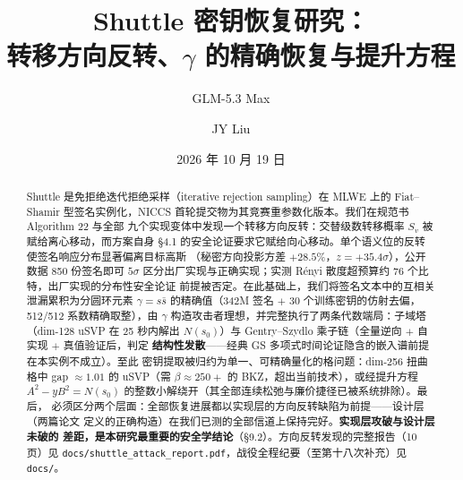 \documentclass[UTF8,11pt,a4paper]{ctexart}
\title{\vspace{-1.2cm}\textbf{Shuttle 密钥恢复研究：\\转移方向反转、$\gamma$ 的精确恢复与提升方程}}
\author{GLM-5.3 Max \and JY Liu}
\date{2026 年 10 月 19 日}
\newcommand{\code}[1]{\texttt{\small #1}}
\begin{document}
\maketitle
\thispagestyle{fancy}

\begin{abstract}\noindent
Shuttle 是免拒绝迭代拒绝采样（iterative rejection sampling）在 MLWE 上的 Fiat--Shamir
型签名实例化，NICCS 首轮提交物为其竞赛重参数化版本。我们在规范书 Algorithm 22 与全部
九个实现变体中发现一个转移方向反转：交替级数转移概率 $S_v$ 被赋给离心移动，而方案自身
\S4.1 的安全论证要求它赋给向心移动。单个语义位的反转使签名响应分布显著偏离目标高斯
（秘密方向投影方差 $+28.5\%$，$z = +35.4\sigma$），公开数据 850 份签名即可 $5\sigma$
区分出厂实现与正确实现；实测 R\'enyi 散度超预算约 76 个比特，出厂实现的分布性安全论证
前提被否定。在此基础上，我们将签名文本中的互相关泄漏累积为分圆环元素 $\gamma = s\bar s$
的精确值（342M 签名 $+$ 30 个训练密钥的仿射去偏，512/512 系数精确取整），由 $\gamma$
构造攻击者理想，并完整执行了两条代数端局：子域塔（dim-128 uSVP 在 25 秒内解出
$N(s_0)$）与 Gentry--Szydlo 乘子链（全量逆向 $+$ 自实现 $+$ 真值验证后，判定
\textbf{结构性发散}——经典 GS 多项式时间论证隐含的嵌入谱前提在本实例不成立）。至此
密钥提取被归约为单一、可精确量化的格问题：dim-256 扭曲格中 gap $\approx 1.01$ 的
uSVP（需 $\beta \approx 250{+}$ 的 BKZ，超出当前技术），或经提升方程
$A^2 - yB^2 = N(s_0)$ 的整数小解绕开（其全部连续松弛与廉价捷径已被系统排除）。最后，
必须区分两个层面：全部恢复进展都以实现层的方向反转缺陷为前提——设计层（两篇论文
定义的正确构造）在我们已测的全部信道上保持完好。\textbf{实现层攻破与设计层未破的
差距，是本研究最重要的安全学结论}（\S9.2）。方向反转发现的完整报告（10 页）见
\code{docs/shuttle\_attack\_report.pdf}，战役全程纪要（至第十八次补充）见 \code{docs/}。


\end{abstract}
\end{document}
